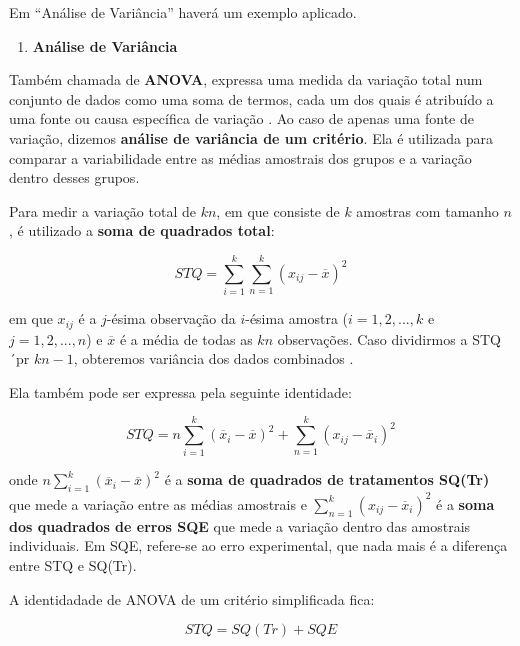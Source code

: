 \documentclass[
  openany]{book}
\providecommand{\tightlist}{%
  \setlength{\itemsep}{0pt}\setlength{\parskip}{0pt}}
\begin{document}
Em ``Análise de Variância'' haverá um exemplo aplicado.

\begin{enumerate}
\def\labelenumi{\arabic{enumi}.}
\setcounter{enumi}{16}
\tightlist
\item
  \textbf{Análise de Variância}
\end{enumerate}

Também chamada de \textbf{ANOVA}, expressa uma medida da variação total num conjunto de dados como uma soma de termos, cada um dos quais é atribuído a uma fonte ou causa específica de variação \citep{freund2009estatistica}. Ao caso de apenas uma fonte de variação, dizemos \textbf{análise de variância de um critério}. Ela é utilizada para comparar a variabilidade entre as médias amostrais dos grupos e a variação dentro desses grupos.

Para medir a variação total de \(kn\), em que consiste de \(k\) amostras com tamanho \(n\), é utilizado a \textbf{soma de quadrados total}:

\begin{equation} 
STQ= \displaystyle \sum^k_{i=1} \displaystyle \sum^k_{n=1}(x_{ij}-\overline{x})^2
  \label{eq:sqtanova}
\end{equation}

em que \(x_{ij}\) é a \(j\)-ésima observação da \(i\)-ésima amostra (\(i=1,2,...,k\) e \(j=1,2,...,n\)) e \(\overline{x}\) é a média de todas as \(kn\) observações. Caso dividirmos a STQ ´pr \(kn-1\), obteremos variância dos dados combinados \citep{freund2009estatistica}.

Ela também pode ser expressa pela seguinte identidade:

\begin{equation} 
STQ= n \displaystyle \sum^k_{i=1} (\overline{x}_i-\overline{x})^2+ \displaystyle \sum^k_{n=1}(x_{ij}-\overline{x}_i)^2
  \label{eq:sqtanova2}
\end{equation}

onde \(n \displaystyle \sum^k_{i=1} (\overline{x}_i-\overline{x})^2\) é a \textbf{soma de quadrados de tratamentos SQ(Tr)} que mede a variação entre as médias amostrais e \(\displaystyle \sum^k_{n=1}(x_{ij}-\overline{x}_i)^2\) é a \textbf{soma dos quadrados de erros SQE} que mede a variação dentro das amostrais individuais. Em SQE, refere-se ao erro experimental, que nada mais é a diferença entre STQ e SQ(Tr).

A identidadade de ANOVA de um critério simplificada fica:

\begin{equation} 
STQ= SQ(Tr)+SQE
  \label{eq:sqtanova3}
\end{equation}
\end{document}
